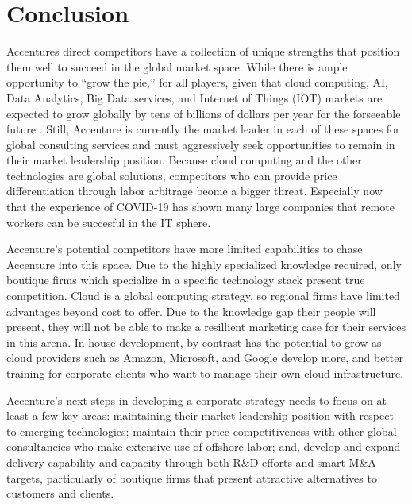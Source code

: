 \section{Conclusion}

Accentures direct competitors have a collection of unique strengths that position them well to succeed in the global market space. While there is ample opportunity to ``grow the pie,'' for all players, given that cloud computing, AI, Data Analytics, Big Data services, and Internet of Things (IOT) markets are expected to grow globally by tens of billions of dollars per year for the forseeable future \parencite{GartnerForecastsWorldwide}. Still, Accenture is currently the market leader in each of these spaces for global consulting services and must aggressively seek opportunities to remain in their market leadership position. Because cloud computing and the other technologies are global solutions, competitors who can provide price differentiation through labor arbitrage beome a bigger threat. Especially now that the experience of COVID-19 has shown many large companies that remote workers can be succesful in the IT sphere.

Accenture's potential competitors have more limited capabilities to chase Accenture into this space. Due to the highly specialized knowledge required, only boutique firms which specialize in a specific technology stack present true competition. Cloud is a global computing strategy, so regional firms have limited advantages beyond cost to offer. Due to the knowledge gap their people will present, they will not be able to make a resillient marketing case for their services in this arena. In-house development, by contrast has the potential to grow as cloud providers such as Amazon, Microsoft, and Google develop more, and better training for corporate clients who want to manage their own cloud infrastructure.

Accenture's next steps in developing a corporate strategy needs to focus on at least a few key areas: maintaining their market leadership position with respect to emerging technologies; maintain their price competitiveness with other global consultancies who make extensive use of offshore labor; and, develop and expand delivery capability and capacity through both R\&D efforts and smart M\&A targets, particularly of boutique firms that present attractive alternatives to customers and clients.
